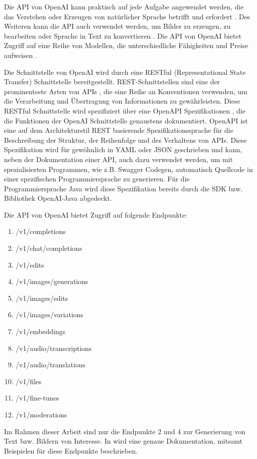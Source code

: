 Die API von OpenAI kann praktisch auf jede Aufgabe angewendet werden, die das Verstehen oder Erzeugen von natürlicher Sprache betrifft und erfordert \cite{openai-docs-intro}.
Des Weiteren kann die API auch verwendet werden, um Bilder zu erzeugen, zu bearbeiten oder Sprache in Text zu konvertieren \cite{openai-docs-intro}.
Die API von OpenAI bietet Zugriff auf eine Reihe von Modellen, die unterschiedliche Fähigkeiten und Preise aufweisen \cite{openai-docs-intro}.

Die Schnittstelle von OpenAI wird durch eine RESTful (Representational State Transfer) Schnittstelle bereitgestellt.
REST-Schnittstellen sind eine der prominenteste Arten von APIs \cite{postman-state-of-api-2023}, die eine Reihe an Konventionen verwenden, um die Verarbeitung und Übertragung von Informationen zu gewährleisten.
Diese RESTful Schnittstelle wird spezifiziert über eine OpenAPI Spezifikationen \cite{openai-openapi-spec}, die die Funktionen der OpenAI Schnittstelle genaustens dokumentiert.
OpenAPI ist eine auf dem Architekturstil REST basierende Spezifikationssprache für die Beschreibung der Struktur, der Reihenfolge und des Verhaltens von APIs.
Diese Spezifikation wird für gewöhnlich in YAML oder JSON geschrieben und kann, neben der Dokumentation einer API, auch dazu verwendet werden, um mit spezialisierten Programmen, wie z.B. Swagger Codegen, automatisch Quellcode in einer spezifischen Programmiersprache zu generieren.
Für die Programmiersprache Java wird diese Spezifikation bereits durch die SDK bzw. Bibliothek OpenAI-Java \cite{dall-e-java-api} abgedeckt.

Die API von OpenAI bietet Zugriff auf folgende Endpunkte:
\begin{enumerate}
    \item /v1/completions
    \item /v1/chat/completions
    \item /v1/edits
    \item /v1/images/generations
    \item /v1/images/edits
    \item /v1/images/variations
    \item /v1/embeddings
    \item /v1/audio/transcriptions
    \item /v1/audio/translations
    \item /v1/files
    \item /v1/fine-tunes
    \item /v1/moderations
\end{enumerate}
Im Rahmen dieser Arbeit sind nur die Endpunkte 2 und 4 zur Generierung von Text bzw. Bildern von Interesse.
In \cite{openai-api-doc} wird eine genaue Dokumentation, mitsamt Beispielen für diese Endpunkte beschrieben.

